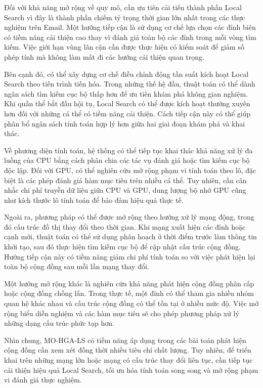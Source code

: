 \documentclass[14pt,a4paper]{extarticle}
\begin{document}
Đối với khả năng mở rộng về quy mô, cần ưu tiên cải tiến thành phần Local Search vì đây là thành phần chiếm tỷ trọng thời gian lớn nhất trong các thực nghiệm trên Email. Một hướng tiếp cận là sử dụng cơ chế lựa chọn các đỉnh biên có tiềm năng cải thiện cao thay vì đánh giá toàn bộ các đỉnh trong mỗi vòng tìm kiếm. Việc giới hạn vùng lân cận cần được thực hiện có kiểm soát để giảm số phép tính mà không làm mất đi các hướng cải thiện quan trọng.

Bên cạnh đó, có thể xây dựng cơ chế điều chỉnh động tần suất kích hoạt Local Search theo tiến trình tiến hóa. Trong những thế hệ đầu, thuật toán có thể dành ngân sách tìm kiếm cục bộ thấp hơn để ưu tiên khám phá không gian nghiệm. Khi quần thể bắt đầu hội tụ, Local Search có thể được kích hoạt thường xuyên hơn đối với những cá thể có tiềm năng cải thiện. Cách tiếp cận này có thể giúp phân bổ ngân sách tính toán hợp lý hơn giữa hai giai đoạn khám phá và khai thác.

Về phương diện tính toán, hệ thống có thể tiếp tục khai thác khả năng xử lý đa luồng của CPU bằng cách phân chia các tác vụ đánh giá hoặc tìm kiếm cục bộ độc lập. Đối với GPU, có thể nghiên cứu mở rộng phạm vi tính toán theo lô, đặc biệt là các phép đánh giá hàm mục tiêu trên nhiều cá thể. Tuy nhiên, cần cân nhắc chi phí truyền dữ liệu giữa CPU và GPU, dung lượng bộ nhớ GPU cũng như kích thước lô tính toán để bảo đảm hiệu quả thực tế.

Ngoài ra, phương pháp có thể được mở rộng theo hướng xử lý mạng động, trong đó cấu trúc đồ thị thay đổi theo thời gian. Khi mạng xuất hiện các đỉnh hoặc cạnh mới, thuật toán có thể sử dụng phân hoạch ở thời điểm trước làm thông tin khởi tạo, sau đó thực hiện tìm kiếm cục bộ để cập nhật cấu trúc cộng đồng. Hướng tiếp cận này có tiềm năng giảm chi phí tính toán so với việc phát hiện lại toàn bộ cộng đồng sau mỗi lần mạng thay đổi.

Một hướng mở rộng khác là nghiên cứu khả năng phát hiện cộng đồng phân cấp hoặc cộng đồng chồng lấn. Trong thực tế, một đỉnh có thể tham gia nhiều nhóm quan hệ khác nhau và cấu trúc cộng đồng có thể tồn tại ở nhiều mức độ. Việc mở rộng biểu diễn nghiệm và các hàm mục tiêu sẽ cho phép phương pháp xử lý những dạng cấu trúc phức tạp hơn.

Nhìn chung, MO-HGA-LS có tiềm năng áp dụng trong các bài toán phát hiện cộng đồng cần xem xét đồng thời nhiều tiêu chí chất lượng. Tuy nhiên, để triển khai trên những mạng lớn hoặc mạng có cấu trúc thay đổi liên tục, cần tiếp tục cải thiện hiệu quả Local Search, tối ưu hóa tính toán song song và mở rộng phạm vi đánh giá thực nghiệm.
\end{document}
